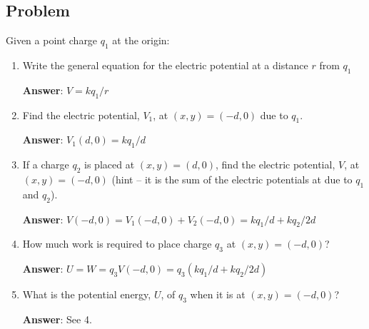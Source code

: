 \documentclass{article}
\begin{document}
\newpage

\subsection{Problem}

Given a point charge $q_1$ at the origin:

\begin{enumerate}

  \item Write the general equation for the electric potential at a distance $r$ from $q_1$

        \ifsolutions
        \textbf{Answer}:
        $V=kq_1/r$
        \else

        \vskip 36pt
        \fi

  \item Find the electric potential, $V_1$, at $(x,y) = (-d,0)$ due to $q_1$.

        \ifsolutions
        \textbf{Answer}:
        $V_1(d,0)=kq_1/d$
        \else

        \vskip 36pt
        \fi

  \item If a charge $q_2$ is placed at $(x,y) = (d,0)$, find the electric potential, $V$, at $(x,y) = (-d,0)$ (hint -- it is the sum of the electric potentials at due to $q_1$ and $q_2$).

        \ifsolutions
        \textbf{Answer}:
        $V(-d,0)=V_1(-d,0)+V_2(-d,0) = kq_1/d + kq_2/2d$
        \else

        \vskip 36pt
        \fi

  \item How much work is required to place charge $q_3$ at $(x,y) = (-d,0)$?

        \ifsolutions
        \textbf{Answer}:
        $U=W=q_3V(-d,0)=q_3(kq_1/d + kq_2/2d)$
        \else

        \vskip 36pt
        \fi

  \item What is the potential energy, $U$, of $q_3$ when it is at $(x,y) = (-d,0)$?

        \ifsolutions
        \textbf{Answer}:
        See 4.
        \else

        \vskip 36pt
        \fi

\end{enumerate}

\end{document}
